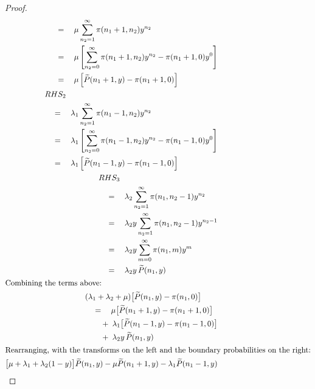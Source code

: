 \begin{proof}
\begin{align}
\begin{split}
            & \quad = \quad \mu\sum_{n_2=1}^{\infty}\pi(n_1+1,n_2)y^{n_2} \\
            & \quad = \quad \mu \left[ \sum_{n_2=0}^{\infty}\pi(n_1+1,n_2)y^{n_2} - \pi(n_1+1,0)y^0 \right] \\
            & \quad = \quad \mu \left[ \widetilde{P}(n_1+1,y) - \pi(n_1+1,0) \right]
        \end{split} \nonumber \\
        \begin{split}
            & RHS_2 \\
            & \quad = \quad \lambda_1\sum_{n_2=1}^{\infty}\pi(n_1-1,n_2)y^{n_2} \\
            & \quad = \quad \lambda_1 \left[ \sum_{n_2=0}^{\infty}\pi(n_1-1,n_2)y^{n_2} - \pi(n_1-1,0)y^0 \right] \\
            & \quad = \quad \lambda_1 \left[ \widetilde{P}(n_1-1,y) - \pi(n_1-1,0) \right]
        \end{split} \nonumber \\
        \begin{split}
            & RHS_3 \\
            & \quad = \quad \lambda_2\sum_{n_2=1}^{\infty}\pi(n_1,n_2-1)y^{n_2} \\
            & \quad = \quad \lambda_2 y \sum_{n_2=1}^{\infty}\pi(n_1,n_2-1)y^{n_2-1} \\
            & \quad = \quad \lambda_2 y \sum_{m=0}^{\infty}\pi(n_1,m)y^{m} \\
            & \quad = \quad \lambda_2 y \, \widetilde{P}(n_1,y)
        \end{split} \nonumber \\
        \intertext{Combining the terms above:}
        \begin{split}
            & (\lambda_1+\lambda_2+\mu)\bigl[\widetilde{P}(n_1,y)-\pi(n_1,0)\bigr] \\
            & \quad = \quad \mu\bigl[\widetilde{P}(n_1+1,y)-\pi(n_1+1,0)\bigr] \\
            & \quad \quad + \; \lambda_1\bigl[\widetilde{P}(n_1-1,y)-\pi(n_1-1,0)\bigr] \\
            & \quad \quad + \; \lambda_2 y\,\widetilde{P}(n_1,y)
        \end{split} \nonumber \\
        \intertext{Rearranging, with the transforms on the left and the boundary probabilities on the right:}
        \begin{split}
            & \bigl[\mu+\lambda_1+\lambda_2(1-y)\bigr]\widetilde{P}(n_1,y) -\mu\widetilde{P}(n_1+1,y)-\lambda_1\widetilde{P}(n_1-1,y) \\

\end{split}
\end{align}
\end{proof}
